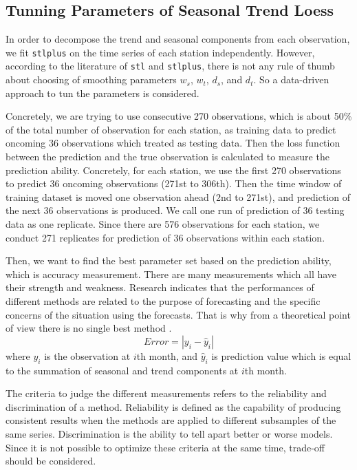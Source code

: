 \subsection{Tunning Parameters of Seasonal Trend Loess}

In order to decompose the trend and seasonal components from each observation, we 
fit \texttt{stlplus} on the time series of each station independently. However,
according to the literature of \texttt{stl} and \texttt{stlplus}, there is not 
any rule of thumb about choosing of smoothing parameters $w_s$, $w_t$, $d_s$, and 
$d_t$. So a data-driven approach to tun the parameters is considered. 

Concretely, we are trying to use consecutive 270 observations, which is about 
50\% of the total number of observation for each station, as training 
data to predict oncoming 36 observations which treated as testing data. Then the 
loss function between the prediction and the true observation is calculated to 
measure the prediction ability. Concretely, for 
each station, we use the first 270 observations to predict 36 oncoming 
observations (271st to 306th). Then the time window of training dataset is moved 
one observation ahead (2nd to 271st), and prediction of the next 36 observations 
is produced. We call one run of prediction of 36 testing data as one replicate. 
Since there are 576 observations for each station, we conduct 271 replicates for 
prediction of 36 observations within each station.

Then, we want to find the best parameter set based on the prediction ability,
which is accuracy measurement. 
There are many measurements which all have their strength and weakness. 
Research indicates that the performances of different methods are related to the
purpose of forecasting and the specific concerns of the situation using the 
forecasts. 
That is why from a theoretical point of view there is no single best method 
\cite{brockwell2002introduction}.
$$
Error = | y_i - \hat y_i |
$$
where $y_i$ is the observation at $i$th month, and $\hat y_i$ is prediction value
which is equal to the summation of seasonal and trend components at $i$th month.

The criteria to judge the different measurements refers to the reliability and
discrimination of a method. Reliability is defined as the capability of producing 
consistent results when the methods are applied to different subsamples of the 
same series. Discrimination is the ability to tell apart better or worse models. 
Since it is not possible to optimize these criteria at the same time, trade-off 
should be considered.

